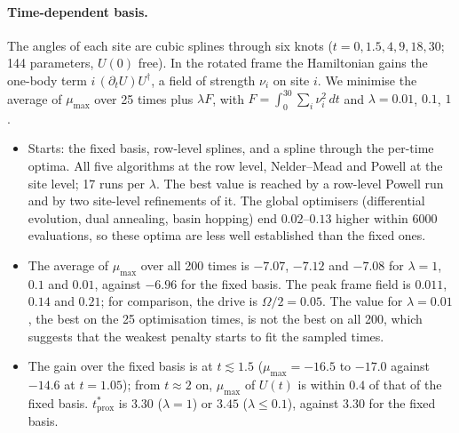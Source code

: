 \documentclass[11pt,a4paper]{article}
\newcommand{\tprox}{t^*_{\mathrm{prox}}}
\begin{document}
\paragraph{Time-dependent basis.} The angles of each site are cubic splines through six knots ($t=0, 1.5, 4, 9, 18,
30$; 144 parameters, $U(0)$ free). In the rotated frame the Hamiltonian gains the one-body term
$i\,(\partial_tU)U^\dagger$, a field of strength $\nu_i$ on site $i$. We minimise the average of $\mu_{\max}$ over 25
times plus $\lambda F$, with $F=\int_0^{30}\sum_i\nu_i^2\,dt$ and $\lambda=0.01$, $0.1$, $1$.
\begin{itemize}
  \item Starts: the fixed basis, row-level splines, and a spline through the per-time optima. All five algorithms at
    the row level, Nelder--Mead and Powell at the site level; 17 runs per $\lambda$. The best value is reached by a
    row-level Powell run and by two site-level refinements of it. The global optimisers (differential evolution, dual
    annealing, basin hopping) end $0.02$--$0.13$ higher within 6000 evaluations, so these optima are less well
    established than the fixed ones.
  \item The average of $\mu_{\max}$ over all 200 times is $-7.07$, $-7.12$ and $-7.08$ for $\lambda=1$, $0.1$ and
    $0.01$, against $-6.96$ for the fixed basis. The peak frame field is $0.011$, $0.14$ and $0.21$; for comparison, the
    drive is $\Omega/2=0.05$. The value for $\lambda=0.01$, the best on the 25 optimisation times, is not the best on
    all 200, which suggests that the weakest penalty starts to fit the sampled times.
  \item The gain over the fixed basis is at $t\lesssim1.5$ ($\mu_{\max}=-16.5$ to $-17.0$ against $-14.6$ at $t=1.05$);
    from $t\approx2$ on, $\mu_{\max}$ of $U(t)$ is within $0.4$ of that of the fixed basis. $\tprox$ is $3.30$
    ($\lambda=1$) or $3.45$ ($\lambda\le0.1$), against $3.30$ for the fixed basis.
\end{itemize}
\end{document}
